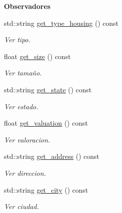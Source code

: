 \begin{Indent}{\bf Observadores}\par
\begin{DoxyCompactItemize}
\item 
std\+::string \hyperlink{class_c_housing_a42f83879e84b7fc7a0a179459d9ec06c}{get\+\_\+type\+\_\+housing} () const 
\begin{DoxyCompactList}\small\item\em Ver tipo. \end{DoxyCompactList}\item 
float \hyperlink{class_c_housing_a8732a56624fd5755a24a97894d30ad97}{get\+\_\+size} () const 
\begin{DoxyCompactList}\small\item\em Ver tamaño. \end{DoxyCompactList}\item 
std\+::string \hyperlink{class_c_housing_a1aaf9cb538de5c857ac251ed4a397361}{get\+\_\+state} () const 
\begin{DoxyCompactList}\small\item\em Ver estado. \end{DoxyCompactList}\item 
float \hyperlink{class_c_housing_a07a7aaca212ab39ba94857f3f06c95b2}{get\+\_\+valuation} () const 
\begin{DoxyCompactList}\small\item\em Ver valoracion. \end{DoxyCompactList}\item 
std\+::string \hyperlink{class_c_housing_a0220d7211ea0a81a3df1c3355504be20}{get\+\_\+address} () const 
\begin{DoxyCompactList}\small\item\em Ver direccion. \end{DoxyCompactList}\item 
std\+::string \hyperlink{class_c_housing_a7de47dffc81d95eeafb7d53cfe238cad}{get\+\_\+city} () const 
\begin{DoxyCompactList}\small\item\em Ver ciudad. \end{DoxyCompactList}\end{DoxyCompactItemize}
\end{Indent}

